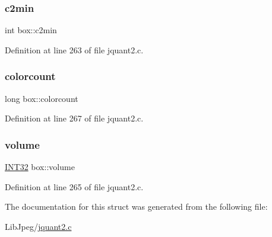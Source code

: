 \subsubsection{\texorpdfstring{c2min}{c2min}}
{\footnotesize\ttfamily int box\+::c2min}



Definition at line 263 of file jquant2.\+c.

\mbox{\label{structbox_af92a3080724bf452855f631e901b803c}} 
\subsubsection{\texorpdfstring{colorcount}{colorcount}}
{\footnotesize\ttfamily long box\+::colorcount}



Definition at line 267 of file jquant2.\+c.

\mbox{\label{structbox_acaba83fb8356e20d21793c23c41033a1}} 
\subsubsection{\texorpdfstring{volume}{volume}}
{\footnotesize\ttfamily \mbox{\hyperlink{jmorecfg_8h_a0cb58e7e6f0bad369840a52e54a56ae0}{I\+N\+T32}} box\+::volume}



Definition at line 265 of file jquant2.\+c.



The documentation for this struct was generated from the following file\+:\begin{DoxyCompactItemize}
\item 
Lib\+Jpeg/\mbox{\hyperlink{jquant2_8c}{jquant2.\+c}}\end{DoxyCompactItemize}
